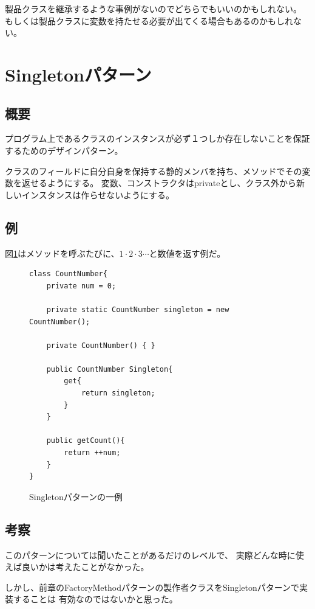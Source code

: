 \documentclass[11pt]{jsarticle}
\begin{document}
					製品クラスを継承するような事例がないのでどちらでもいいのかもしれない。
					もしくは製品クラスに変数を持たせる必要が出てくる場合もあるのかもしれない。				
			\color{black}
			
	\section{Singletonパターン}
		\subsection{概要}
			プログラム上であるクラスのインスタンスが必ず１つしか存在しないことを保証するためのデザインパターン。
			
			クラスのフィールドに自分自身を保持する静的メンバを持ち、メソッドでその変数を返せるようにする。
			変数、コンストラクタはprivateとし、クラス外から新しいインスタンスは作らせないようにする。
			
		\subsection{例}
			図\ref{fig::Singleton1}はメソッドを呼ぶたびに、$1\cdot 2\cdot 3\cdots$と数値を返す例だ。
			
			\begin{figure}[htbp]
				\centering
				\begin{lstlisting}[basicstyle=\ttfamily\scriptsize, frame=single] 
class CountNumber{
	private num = 0;

	private static CountNumber singleton = new CountNumber();
	
	private CountNumber() { }
	
	public CountNumber Singleton{
		get{
			return singleton;
		}
	}
	
	public getCount(){
		return ++num;
	}
}
				\end{lstlisting}
				\caption{Singletonパターンの一例}
				\label{fig::Singleton1}
			\end{figure}
			
		\subsection{考察}
			このパターンについては聞いたことがあるだけのレベルで、
			実際どんな時に使えば良いかは考えたことがなかった。
			
			しかし、前章のFactoryMethodパターンの製作者クラスをSingletonパターンで実装することは
			有効なのではないかと思った。
			
\end{document}
